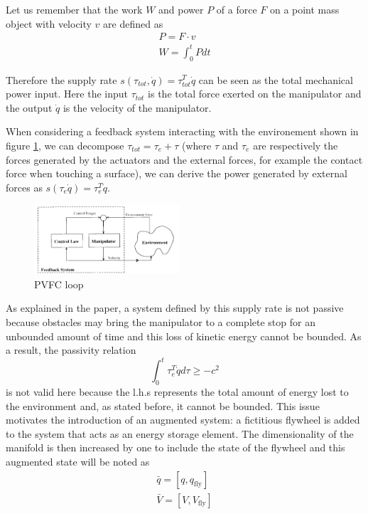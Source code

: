 Let us remember that the work $W$ and power $P$ of a force $F$ on a point mass object with velocity $v$ are defined as
\begin{align}
    P = F\cdot v\\
    W = \int_{0}^{t}P dt
\end{align}

Therefore the supply rate  $s(\tau_{tot},\dot{q})=\tau_{tot}^{T}\dot{q}$ can be seen as the total mechanical power input. Here the input $\tau_{tot}$ is the total force exerted on the manipulator 
and the output $\dot{q}$ is the velocity of the manipulator. 

When considering a feedback system interacting with the environement shown in figure \ref{fig:pvfccontrolloop}, we can decompose $\tau_{tot}=\tau_{e}+\tau$ (where $\tau$ and $\tau_{e}$ are respectively the forces generated by the actuators and the external forces, for example the contact force when touching a surface),
we can derive the power generated by external forces as $s(\tau_{e}\dot{q})=\tau_{e}^T \dot{q}$. 
\begin{figure}[h!]
    \centering
    \includegraphics[width=0.48\textwidth]{Images/pvfccontrolloop.png}
    \caption{PVFC loop \cite{li1999passive}}
    \label{fig:pvfccontrolloop}
\end{figure} 
As explained in the paper, a system defined by this supply rate is not passive because obstacles may bring the manipulator to a complete stop for an unbounded amount of time and this loss of kinetic energy cannot be bounded. 
As a result, the passivity relation 
\begin{equation}
    \int_{0}^{t}\tau_{e}^T \dot{q}d\tau \geq -c^2 
\end{equation}
is not valid here because the l.h.s represents the total amount of energy lost to the environment and, as stated before, it cannot be bounded. 
This issue motivates the introduction of an augmented system: a fictitious flywheel is added to the system that acts as an energy storage element.
The dimensionality of the manifold is then increased by one to include the state of the flywheel and this augmented state will be noted as
\begin{align} 
    \bar{q}=[q,q_{\text{fly}}]\\
    \bar{V} = [V, V_{\text{fly}}]
\end{align}


